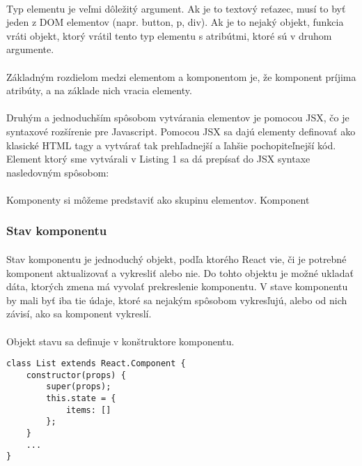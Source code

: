 \paragraph{}
Typ elementu je veľmi dôležitý argument. Ak je to textový reťazec, musí to byť jeden z DOM elementov (napr. button, p, div). Ak je to nejaký objekt, funkcia vráti objekt, ktorý vrátil tento typ elementu s atribútmi, ktoré sú v druhom argumente.

\paragraph{}
Základným rozdielom medzi elementom a komponentom je, že komponent príjima atribúty, a na základe nich vracia elementy.

\paragraph{}
Druhým a jednoduchším spôsobom vytvárania elementov je pomocou JSX, čo je syntaxové rozšírenie pre Javascript. Pomocou JSX sa dajú elementy definovať ako klasické HTML tagy a vytvárať tak prehľadnejší a ľahšie pochopiteľnejší kód. Element ktorý sme vytvárali v Listing 1 sa dá prepísať do JSX syntaxe nasledovným spôsobom:


\paragraph{}
Komponenty si môžeme predstaviť ako skupinu elementov. Komponent 

\subsubsection{Stav komponentu}
\paragraph{}
Stav komponentu je jednoduchý objekt, podľa ktorého React vie, či je potrebné komponent aktualizovať a vykresliť alebo nie. Do tohto objektu je možné ukladať dáta, ktorých zmena má vyvolať prekreslenie komponentu. V stave komponentu by mali byť iba tie údaje, ktoré sa nejakým spôsobom vykresľujú, alebo od nich závisí, ako sa komponent vykreslí. 
\paragraph{}
Objekt stavu sa definuje v konštruktore komponentu.
\begin{lstlisting}[caption=Definovanie stavu v konštruktore komponentu]
class List extends React.Component {
	constructor(props) {
		super(props);
		this.state = {
			items: []
		};
	}
	...
}
\end{lstlisting}
